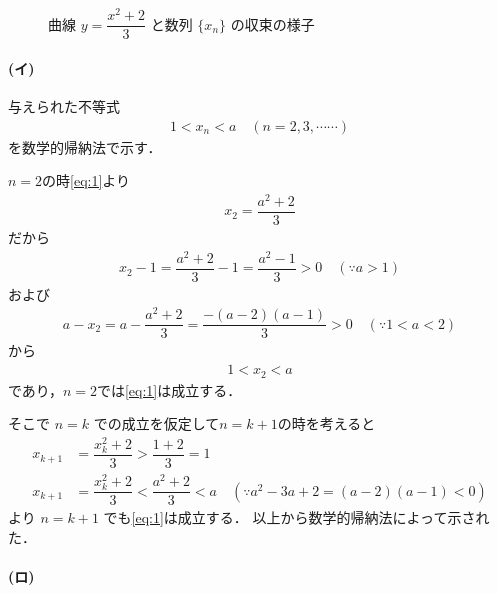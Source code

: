 \documentclass[../../main.tex]{subfiles}
\begin{document}
\begin{figure}[htb]
  \caption{曲線 $y = \dfrac{x^2+2}{3}$ と数列 $\{x_n\}$ の収束の様子}
  \label{fig:1970_6_sequence_cobweb}
\end{figure}

\paragraph{(イ)}

与えられた不等式
\begin{align}
  1<x_n<a \quad (n=2,3,\cdots\cdots) \label{eq:1}
\end{align}
を数学的帰納法で示す．

$n=2$の時\cref{eq:1}より
\begin{align}
  x_2 = \dfrac{a^2+2}{3}
\end{align}
だから
\begin{align}
  x_2 -1 = \dfrac{a^2+2}{3} - 1 = \dfrac{a^2-1}{3} > 0 \quad (\because a>1)
\end{align}
および
\begin{align}
  a - x_2 = a-\dfrac{a^2+2}{3} = \dfrac{-(a-2)(a-1)}{3} > 0 \quad (\because 1<a<2)
\end{align}
から
\begin{align}
  1 < x_2 < a
\end{align}
であり，$n=2$では\cref{eq:1}は成立する．

そこで $n=k$ での成立を仮定して$n=k+1$の時を考えると
\begin{align}
  x_{k+1} &= \dfrac{x_k^2 + 2}{3} > \dfrac{1+2}{3} = 1 \\
  x_{k+1} &= \dfrac{x_k^2 + 2}{3} < \dfrac{a^2 + 2}{3} < a \quad (\because a^2 - 3a + 2 = (a-2)(a-1) < 0)
\end{align}
より $n=k+1$ でも\cref{eq:1}は成立する．
以上から数学的帰納法によって示された．

\paragraph{(ロ)}
\end{document}
